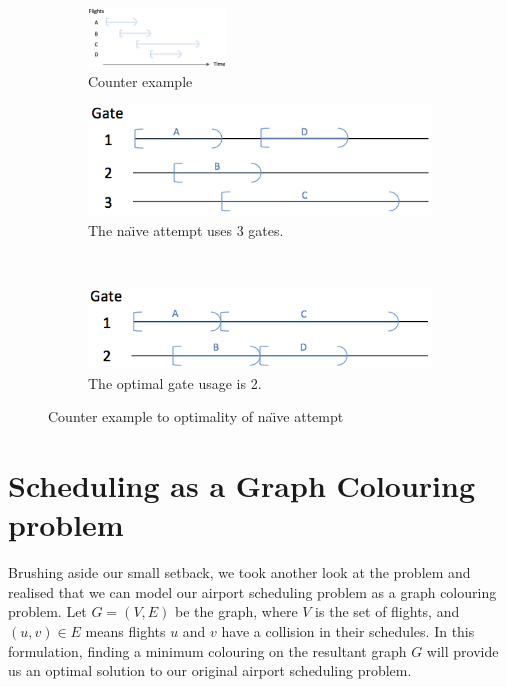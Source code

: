 \documentclass[12pt, a4paper]{report}
\begin{document}
\begin{figure}[h!]
\centering
\begin{subfigure}[b]{\textwidth}
	\centering
	\includegraphics[width=0.4\textwidth]{../figures/counter-example.png}
	\caption{Counter example}
\end{subfigure}
	\centering
	\begin{subfigure}[b]{0.5\textwidth}
	\includegraphics[width=\textwidth]{../figures/counter-example_naive.png}
	\caption{The na\"{\i}ve attempt uses 3 gates.}
\end{subfigure}~
	\centering
	\begin{subfigure}[b]{0.5\textwidth}
	\includegraphics[width=\textwidth]{../figures/counter-example_opt.png}
	\caption{The optimal gate usage is 2.}
\end{subfigure}
\caption{Counter example to optimality of na\"{\i}ve attempt}
\label{fig:Counter-example}
\end{figure}

\section{Scheduling as a Graph Colouring problem}
Brushing aside our small setback, we took another look at the problem and realised that we can model our airport scheduling problem as a graph colouring problem. Let $G = (V,E)$ be the graph, where $V$ is the set of flights, and $(u,v) \in E$ means flights $u$ and $v$ have a collision in their schedules. In this formulation, finding a minimum colouring on the resultant graph $G$ will provide us an optimal solution to our original airport scheduling problem.
\end{document}

